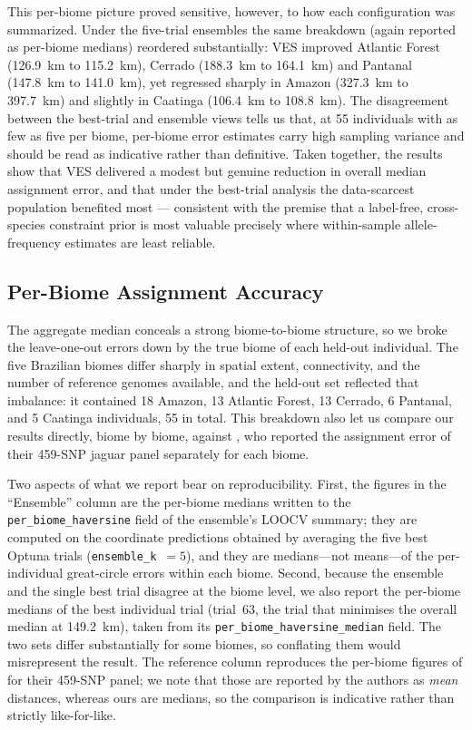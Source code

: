 \documentclass[twocolumn,10pt]{article}
\begin{document}
This per-biome picture proved sensitive, however, to how each configuration was summarized. Under
the five-trial ensembles the same breakdown (again reported as per-biome medians) reordered
substantially: VES improved Atlantic Forest (126.9~km to 115.2~km), Cerrado (188.3~km to 164.1~km)
and Pantanal (147.8~km to 141.0~km), yet regressed sharply in Amazon (327.3~km to 397.7~km) and
slightly in Caatinga (106.4~km to 108.8~km). The disagreement between the best-trial and ensemble
views tells us that, at 55 individuals with as few as five per biome, per-biome error estimates
carry high sampling variance and should be read as indicative rather than definitive. Taken
together, the results show that VES delivered a modest but genuine reduction in overall median
assignment error, and that under the best-trial analysis the data-scarcest population benefited most
--- consistent with the premise that a label-free, cross-species constraint prior is most valuable
precisely where within-sample allele-frequency estimates are least reliable.

\subsection{Per-Biome Assignment Accuracy}
The aggregate median conceals a strong biome-to-biome structure, so we broke the leave-one-out
errors down by the true biome of each held-out individual. The five Brazilian biomes differ sharply
in spatial extent, connectivity, and the number of reference genomes available, and the held-out set
reflected that imbalance: it contained 18 Amazon, 13 Atlantic Forest, 13 Cerrado, 6 Pantanal, and 5
Caatinga individuals, 55 in total. This breakdown also let us compare our results directly, biome by
biome, against \citet{lazzari2025development}, who reported the assignment error of their 459-SNP
jaguar panel separately for each biome.

Two aspects of what we report bear on reproducibility. First, the figures in the ``Ensemble'' column
are the per-biome medians written to the \texttt{per\_biome\_haversine} field of the ensemble's
LOOCV summary; they are computed on the coordinate predictions obtained by averaging the five best
Optuna trials (\texttt{ensemble\_k}~$=5$), and they are medians---not means---of the per-individual
great-circle errors within each biome. Second, because the ensemble and the single best trial
disagree at the biome level, we also report the per-biome medians of the best individual trial
(trial~63, the trial that minimises the overall median at 149.2~km), taken from its
\texttt{per\_biome\_haversine\_median} field. The two sets differ substantially for some biomes, so
conflating them would misrepresent the result. The reference column reproduces the per-biome figures
of \citet{lazzari2025development} for their 459-SNP panel; we note that those are reported by the
authors as \emph{mean} distances, whereas ours are medians, so the comparison is indicative rather
than strictly like-for-like.
\end{document}
